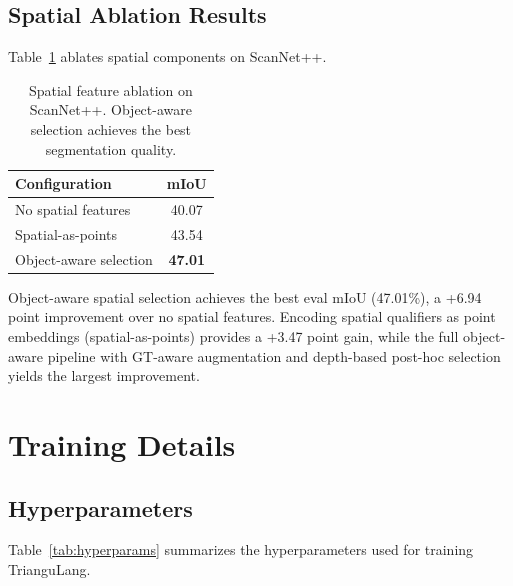 \subsection{Spatial Ablation Results}

Table~\ref{tab:spatial_ablation} ablates spatial components on ScanNet++.

\begin{table}[h]
\centering
\caption{Spatial feature ablation on ScanNet++. Object-aware selection achieves the best segmentation quality.}
\label{tab:spatial_ablation}
\small
\begin{tabular}{@{}lc@{}}
\toprule
\textbf{Configuration} & \textbf{mIoU} \\
\midrule
No spatial features & 40.07 \\
Spatial-as-points & 43.54 \\
Object-aware selection & \textbf{47.01} \\
\bottomrule
\end{tabular}
\end{table}

Object-aware spatial selection achieves the best eval mIoU (47.01\%), a +6.94 point improvement over no spatial features. Encoding spatial qualifiers as point embeddings (spatial-as-points) provides a +3.47 point gain, while the full object-aware pipeline with GT-aware augmentation and depth-based post-hoc selection yields the largest improvement.

\section{Training Details}
\label{app:training}

\subsection{Hyperparameters}

Table~\ref{tab:hyperparams} summarizes the hyperparameters used for training TrianguLang.

